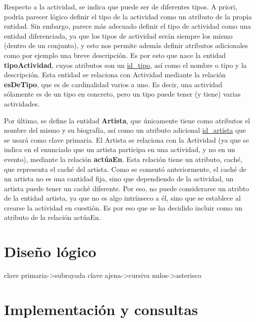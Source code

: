 \documentclass[a4paper,onecolumn]{article}
\let\stdsection\section
\renewcommand\section{\newpage\stdsection}
\begin{document}
\begin{sloppypar}
Respecto a la actividad, se indica que puede ser de diferentes tipos. A priori, podría parecer lógico definir el tipo de la actividad como un atributo 
de la propia entidad. Sin embargo, parece más adecuado definir el tipo de actividad como una entidad diferenciada, ya que los tipos de actividad 
serán siempre los mismo (dentro de un conjunto), y esto nos permite además definir atributos adicionales como por ejemplo una breve descripción. Es 
por esto que nace la entidad \textbf{tipoActividad}, cuyos atributos son un \underline{id\_tipo}, así como el nombre o tipo y la descripción. Esta 
entidad se relaciona con Actividad mediante la relación \textbf{esDeTipo}, que es de cardinalidad varios a uno. Es decir, una actividad sólamente es 
de un tipo en concreto, pero un tipo puede tener (y tiene) varias actividades.

Por último, se define la entidad \textbf{Artista}, que únicamente tiene como atributos el nombre del mismo y su biografía, así como un atributo 
adicional \underline{id\_artista} que se usará como clave primaria. El Artista se relaciona con la Actividad (ya que se indica en el enunciado que 
un artista participa en una actividad, y no en un evento), mediante la relación \textbf{actúaEn}. Esta relación tiene un atributo, caché, que 
representa el caché del artista. Como se comentó anteriormente, el caché de un artista no es una cantidad fija, sino que dependiendo de la actividad, 
un artista puede tener un caché diferente. Por eso, no puede considerarse un atribto de la entidad artista, ya que no es algo intrínseco a él, 
sino que se establece al crearse la actividad en cuestión. Es por eso que se ha decidido incluir como un atributo de la relación actúaEn.


\section{Diseño lógico} \label{mr}
clave primaria->subrayada
clave ajena->cursiva
nulos->asterisco

\section{Implementación y consultas} \label{sql}


\end{sloppypar}
\end{document}
